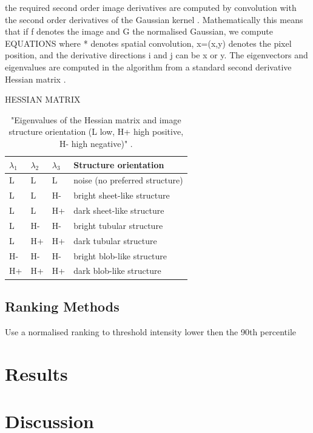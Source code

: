 the required second order image derivatives are computed by convolution with the second order derivatives of the Gaussian kernel \cite{lindeberg1994linear}. Mathematically this means that if f denotes the image and G the normalised Gaussian, we compute
EQUATIONS
where * denotes spatial convolution, x=(x,y) denotes the pixel position, and the derivative directions i and j can be x or y. The eigenvectors and eigenvalues are computed in the algorithm from a standard second derivative Hessian matrix \cite{meijering2004design}.

HESSIAN MATRIX

\begin{table}[h]
\centering
\caption{"Eigenvalues of the Hessian matrix and image structure
orientation (L low, H+ high positive, H- high negative)" \cite{rudzki2009vessel}.}
\begin{tabular}{@{}llll@{}}
\toprule
$\lambda_1$ & $\lambda_2$ & $\lambda_3$ & Structure orientation          \\ \midrule
L           & L           & L           & noise (no preferred structure) \\
L           & L           & H-          & bright sheet-like structure    \\
L           & L           & H+          & dark sheet-like structure      \\
L           & H-          & H-          & bright tubular structure       \\
L           & H+          & H+          & dark tubular structure         \\
H-          & H-          & H-          & bright blob-like structure     \\
H+          & H+          & H+          & dark blob-like structure       \\ \bottomrule
\end{tabular}
\end{table}

\subsection{Ranking Methods}
Use a normalised ranking to threshold intensity lower then the 90th percentile 

\newpage
\section{Results}

\newpage
\section{Discussion}

